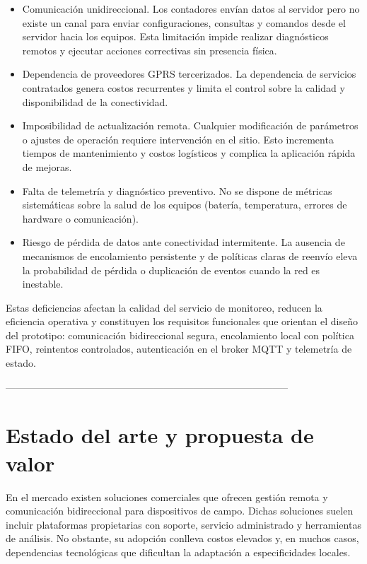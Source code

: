 \begin{itemize}
\item  Comunicación unidireccional. Los contadores envían datos al servidor pero no existe un canal para enviar configuraciones, consultas y comandos desde el servidor hacia los equipos. Esta limitación impide realizar diagnósticos remotos y ejecutar acciones correctivas sin presencia física.

\item  Dependencia de proveedores GPRS tercerizados. La dependencia de servicios contratados genera costos recurrentes y limita el control sobre la calidad y disponibilidad de la conectividad.

\item  Imposibilidad de actualización remota. Cualquier modificación de parámetros o ajustes de operación requiere intervención en el sitio. Esto incrementa tiempos de mantenimiento y costos logísticos y complica la aplicación rápida de mejoras.

\item  Falta de telemetría y diagnóstico preventivo. No se dispone de métricas sistemáticas sobre la salud de los equipos (batería, temperatura, errores de hardware o comunicación).

\item Riesgo de pérdida de datos ante conectividad intermitente. La ausencia de mecanismos de encolamiento persistente y de políticas claras de reenvío eleva la probabilidad de pérdida o duplicación de eventos cuando la red es inestable.

\end{itemize}

Estas deficiencias afectan la calidad del servicio de monitoreo, reducen la eficiencia operativa y constituyen los requisitos funcionales que orientan el diseño del prototipo: comunicación bidireccional segura, encolamiento local con política FIFO, reintentos controlados, autenticación en el broker MQTT y telemetría de estado.


--------------------------------------------------------------------------------------
\newpage

\section{Estado del arte y propuesta de valor}

En el mercado existen soluciones comerciales que ofrecen gestión remota y comunicación bidireccional para dispositivos de campo. Dichas soluciones suelen incluir plataformas propietarias con soporte, servicio administrado y herramientas de análisis. No obstante, su adopción conlleva costos elevados y, en muchos casos, dependencias tecnológicas que dificultan la adaptación a especificidades locales.

